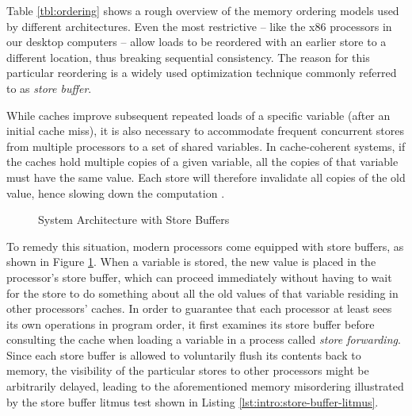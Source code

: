 Table \ref{tbl:ordering} shows a rough overview of the memory ordering models used by different architectures.
Even the most restrictive -- like the x86 processors in our desktop computers -- allow loads to be reordered with an earlier store to a different location, thus breaking sequential consistency.
The reason for this particular reordering is a widely used optimization technique commonly referred to as \emph{store buffer}.

While caches improve subsequent repeated loads of a specific variable (after an initial cache miss),
it is also necessary to accommodate frequent concurrent stores from multiple processors to a set of shared variables.
In cache-coherent systems, if the caches hold multiple copies of a given variable, all the copies of that variable must have the same value.
Each store will therefore invalidate all copies of the old value,
hence slowing down the computation %
\cite{ref:McKenney17}.


\begin{figure}[!h]
  \centering
  
  \caption{System Architecture with Store Buffers}
  \label{fig:intro:store-buffer-architecture}
\end{figure}

To remedy this situation, modern processors come equipped with store buffers, as shown in Figure \ref{fig:intro:store-buffer-architecture}.
When a variable is stored, the new value is placed in the processor's store buffer, which can proceed immediately without having to wait for the store to do something about all the old values of that variable residing in other processors' caches.
In order to guarantee that each processor at least sees its own operations in program order, it first examines its store buffer before consulting the cache when loading a variable in a process called \emph{store forwarding}.
Since each store buffer is allowed to voluntarily flush its contents back to memory, the visibility of the particular stores to other processors might be arbitrarily delayed, leading to the aforementioned memory misordering
illustrated by the store buffer litmus test shown in Listing \ref{lst:intro:store-buffer-litmus}.


